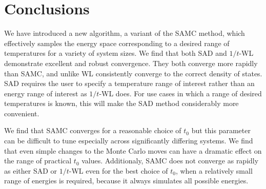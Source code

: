 \documentclass[letterpaper,twocolumn,amsmath,amssymb,pre,aps,10pt]{revtex4-1}
\begin{document}

\section{Conclusions}
We have introduced a new algorithm, a variant of the SAMC method, which
effectively samples the
energy space corresponding to a desired range of temperatures for a
variety of system sizes.
%
We find that both SAD and $1/t$-WL demonstrate excellent and robust
convergence.
They both converge more rapidly than SAMC, and unlike WL consistently
converge to the correct density of states. SAD requires
the user to specify a temperature range of interest rather than an
energy range of interest as $1/t$-WL does.  For use cases in which
a range of desired temperatures is known, this will make the SAD method
considerably more convenient.

We find that SAMC converges for a reasonable choice of
$t_0$ but this parameter can be difficult to tune especially across
significantly differing systems.  We find that even simple
changes to the Monte Carlo moves can have a dramatic effect on the
range of practical $t_0$ values.  Additionaly, SAMC does not
converge as rapidly as either SAD or $1/t$-WL even for the best choice of $t_0$,
when a relatively small range of energies is required, because it always
simulates all possible energies.
\end{document}
